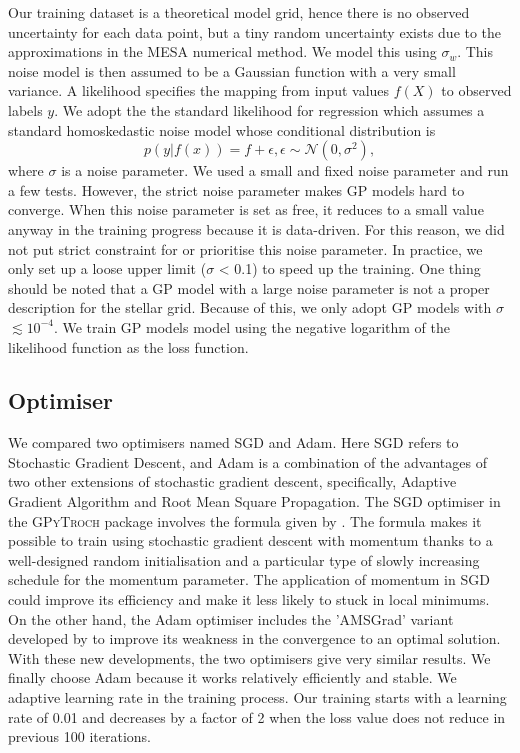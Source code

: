 Our training dataset is a theoretical model grid,  hence there is no observed uncertainty for each data point, but a tiny random uncertainty exists due to the approximations in the \textsc{MESA} numerical method. We model this using $\sigma_{w}$.  This noise model is then assumed to be a Gaussian function with a very small variance.  
%   
A likelihood specifies the mapping from input values $f(X)$ to observed labels $y$.
We adopt the the standard likelihood for regression which assumes a standard homoskedastic noise model whose conditional distribution is
\begin{equation}\label{eq:likelihood}
p(y|f(x)) = f + \epsilon, \epsilon \sim \mathcal{N}(0, \sigma^{2}),
\end{equation}
where $\sigma$ is a noise parameter. 
%
We used a small and fixed noise parameter and run a few tests.  However, the strict noise parameter makes GP models hard to converge. When this noise parameter is set as free, it reduces to a small value anyway in the training progress because it is data-driven.  For this reason, we did not put strict constraint for or prioritise this noise parameter.  In practice, we only set up a loose upper limit ($\sigma$  < 0.1) to speed up the training. One thing should be noted that a GP model with a large noise parameter is not a proper description for the stellar grid. Because of this, we only adopt GP models with $\sigma$ $\lesssim 10^{-4}$. We train GP models model using the negative logarithm of the likelihood function as the loss function.  

\subsection{Optimiser}

We compared two optimisers named SGD and Adam. Here SGD refers to Stochastic Gradient Descent, and Adam is a combination of the advantages of two other extensions of stochastic gradient descent, specifically, Adaptive Gradient Algorithm and Root Mean Square Propagation. 
%
The SGD optimiser in the \textsc{GPyTroch} package involves the formula given by \citet{sutskever2013importance}. The formula makes it possible to train using stochastic gradient descent with momentum thanks to a well-designed random initialisation and a particular type of slowly increasing schedule for the momentum parameter. The application of momentum in SGD could improve its efficiency and make it less likely to stuck in local minimums. On the other hand, the Adam optimiser includes the 'AMSGrad' variant developed by \citet{47409} to improve its weakness in the convergence to an optimal solution. With these new developments, the two optimisers give very similar results. We finally choose Adam because it works relatively efficiently and stable.  
%
We adaptive learning rate in the training process. Our training starts with a learning rate of 0.01 and decreases by a factor of 2 when the loss value does not reduce in previous 100 iterations.    

